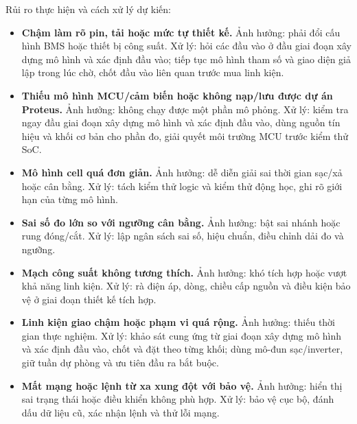 Rủi ro thực hiện và cách xử lý dự kiến:

\begin{itemize}
    \item \textbf{Chậm làm rõ pin, tải hoặc mức tự thiết kế.} Ảnh hưởng: phải đổi cấu hình BMS hoặc thiết bị công suất. Xử lý: hỏi các đầu vào ở đầu giai đoạn xây dựng mô hình và xác định đầu vào; tiếp tục mô hình tham số và giao diện giả lập trong lúc chờ, chốt đầu vào liên quan trước mua linh kiện.
    \item \textbf{Thiếu mô hình MCU/cảm biến hoặc không nạp/lưu được dự án Proteus.} Ảnh hưởng: không chạy được một phần mô phỏng. Xử lý: kiểm tra ngay đầu giai đoạn xây dựng mô hình và xác định đầu vào, dùng nguồn tín hiệu và khối cơ bản cho phần đo, giải quyết môi trường MCU trước kiểm thử SoC.
    \item \textbf{Mô hình cell quá đơn giản.} Ảnh hưởng: dễ diễn giải sai thời gian sạc/xả hoặc cân bằng. Xử lý: tách kiểm thử logic và kiểm thử động học, ghi rõ giới hạn của từng mô hình.
    \item \textbf{Sai số đo lớn so với ngưỡng cân bằng.} Ảnh hưởng: bật sai nhánh hoặc rung đóng/cắt. Xử lý: lập ngân sách sai số, hiệu chuẩn, điều chỉnh dải đo và ngưỡng.
    \item \textbf{Mạch công suất không tương thích.} Ảnh hưởng: khó tích hợp hoặc vượt khả năng linh kiện. Xử lý: rà điện áp, dòng, chiều cấp nguồn và điều kiện bảo vệ ở giai đoạn thiết kế tích hợp.
    \item \textbf{Linh kiện giao chậm hoặc phạm vi quá rộng.} Ảnh hưởng: thiếu thời gian thực nghiệm. Xử lý: khảo sát cung ứng từ giai đoạn xây dựng mô hình và xác định đầu vào, chốt và đặt theo từng khối; dùng mô-đun sạc/inverter, giữ tuần dự phòng và ưu tiên đầu ra bắt buộc.
    \item \textbf{Mất mạng hoặc lệnh từ xa xung đột với bảo vệ.} Ảnh hưởng: hiển thị sai trạng thái hoặc điều khiển không phù hợp. Xử lý: bảo vệ cục bộ, đánh dấu dữ liệu cũ, xác nhận lệnh và thử lỗi mạng.
\end{itemize}
